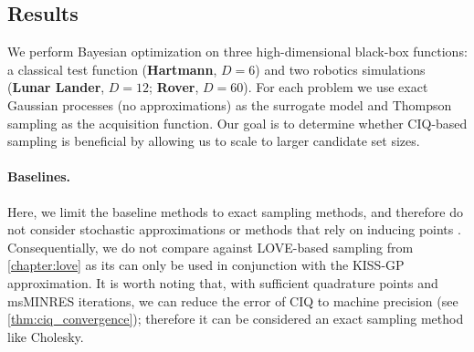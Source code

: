 \subsection{Results}

We perform Bayesian optimization on three high-dimensional black-box functions: a classical test function ({\bf Hartmann}, $D=6$) and two robotics simulations ({\bf Lunar Lander}, $D=12$; {\bf Rover}, $D=60$).
For each problem we use exact Gaussian processes (no approximations) as the surrogate model and Thompson sampling as the acquisition function.
Our goal is to determine whether CIQ-based sampling is beneficial by allowing us to scale to larger candidate set sizes.

\paragraph{Baselines.}
Here, we limit the baseline methods to exact sampling methods, and therefore do not consider stochastic approximations \cite{rahimi2008random} or methods that rely on inducing points \cite{wilson2020efficiently}.
Consequentially, we do not compare against LOVE-based sampling from \cref{chapter:love} as its can only be used in conjunction with the KISS-GP approximation.
It is worth noting that, with sufficient quadrature points and msMINRES iterations, we can reduce the error of CIQ to machine precision (see \cref{thm:ciq_convergence}); therefore it can be considered an exact sampling method like Cholesky.

